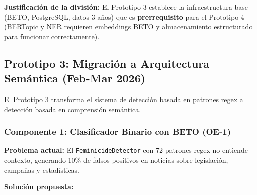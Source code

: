 \textbf{Justificación de la división:} El Prototipo 3 establece la infraestructura base (BETO, PostgreSQL, datos 3 años) que es \textbf{prerrequisito} para el Prototipo 4 (BERTopic y NER requieren embeddings BETO y almacenamiento estructurado para funcionar correctamente).

\subsection{Prototipo 3: Migración a Arquitectura Semántica (Feb-Mar 2026)}
\label{subsec:prototipo3}

El Prototipo 3 transforma el sistema de detección basada en patrones regex a detección basada en comprensión semántica.

\subsubsection{Componente 1: Clasificador Binario con BETO (OE-1)}
\label{subsubsec:beto_clasificador}

\textbf{Problema actual:} El \texttt{FeminicideDetector} con 72 patrones regex no entiende contexto, generando 10\% de falsos positivos en noticias sobre legislación, campañas y estadísticas.

\textbf{Solución propuesta:}


